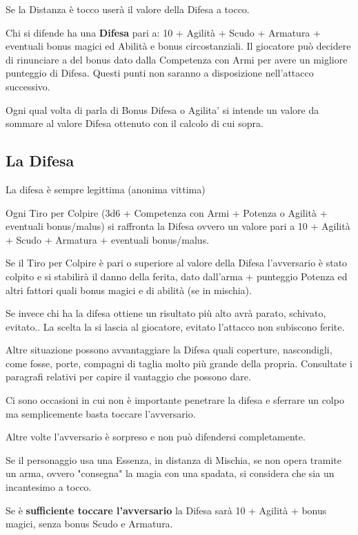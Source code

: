 \documentclass[a4paper,11pt,twoside,openany]{book}
\begin{document}
Se la Distanza è tocco userà il valore della Difesa a tocco.

Chi si difende ha una \textbf{Difesa} pari a: 10 + Agilità + Scudo + Armatura + eventuali bonus magici ed Abilità e bonus circostanziali.
Il giocatore può decidere di rinunciare a del bonus dato dalla Competenza con Armi per avere un migliore punteggio di Difesa. Questi punti non saranno a disposizione nell'attacco successivo.

Ogni qual volta di parla di Bonus Difesa o Agilita' si intende un valore da sommare al valore Difesa ottenuto con il calcolo di cui sopra.

\subsection{La Difesa}

\label{la-difesa}
\begin{tcolorbox}[enhanced,arc=5pt,boxrule=0.3pt]{La difesa è sempre legittima (anonima vittima)}\end{tcolorbox}\medskip
Ogni Tiro per Colpire (3d6 + Competenza con Armi + Potenza o Agilità + eventuali bonus/malus) si raffronta la Difesa ovvero un valore pari a 10 + Agilità + Scudo + Armatura + eventuali bonus/malus.

Se il Tiro per Colpire è pari o superiore al valore della Difesa l'avversario è stato colpito e si stabilirà il danno della ferita, dato dall'arma + punteggio Potenza ed altri fattori quali bonus magici e di abilità (se in mischia).

Se invece chi ha la difesa ottiene un risultato più alto avrà parato, schivato, evitato.. La scelta la si lascia al giocatore, evitato l'attacco non subiscono ferite.

Altre situazione possono avvantaggiare la Difesa quali coperture, nascondigli, come fosse, porte, compagni di taglia molto più grande della propria. Consultate i paragrafi relativi per capire il vantaggio che possono dare.

Ci sono occasioni in cui non è importante penetrare la difesa e sferrare un colpo ma semplicemente basta toccare l'avversario.

Altre volte l'avversario è sorpreso e non può difendersi completamente.

Se il personaggio usa una Essenza, in distanza di Mischia, se non opera tramite un arma, ovvero "consegna" la magia con una spadata, si considera che sia un incantesimo a tocco.

Se è \textbf{sufficiente toccare l'avversario} la Difesa sarà 10 + Agilità + bonus magici, senza bonus Scudo e Armatura.
\end{document}
